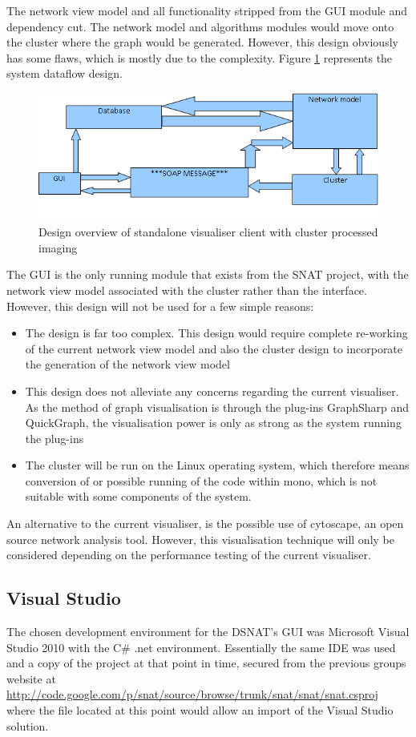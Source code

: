 The network view model and all functionality stripped from the GUI module and dependency cut. The network model and algorithms modules would move onto the cluster where the graph would be generated. However, this design obviously has some flaws, which is mostly due to the complexity. Figure \ref{fig:des2} represents the system dataflow design.

\begin{figure}[htbp]%
\centering
\includegraphics[width=0.6\columnwidth]{./img/des2}%
\caption{Design overview of standalone visualiser client with cluster processed imaging}%
\label{fig:des2}%
\end{figure}

The GUI is the only running module that exists from the SNAT project, with the network view model associated with the cluster rather than the interface. However, this design will not be used for a few simple reasons:

\begin{itemize}
	\item The design is far too complex. This design would require complete re-working of the current network view model and also the cluster design to incorporate the generation of the network view model
	
	\item This design does not alleviate any concerns regarding the current visualiser. As the method of graph visualisation is through the plug-ins GraphSharp and QuickGraph, the visualisation power is only as strong as the system running the plug-ins
	
	\item The cluster will be run on the Linux operating system, which therefore means conversion of or possible running of the code within mono, which is not suitable with some components of the system.
\end{itemize}

An alternative to the current visualiser, is the possible use of cytoscape, an open source network analysis tool. However, this visualisation technique will only be considered depending on the performance testing of the current visualiser.

\subsection{Visual Studio}
The chosen development environment for the DSNAT's GUI was Microsoft Visual Studio 2010 with the C\# .net environment. Essentially the same IDE was used and a copy of the project at that point in time, secured from the previous groups website at \url{http://code.google.com/p/snat/source/browse/trunk/snat/snat/snat.csproj} where the file located at this point would allow an import of the Visual Studio solution.

